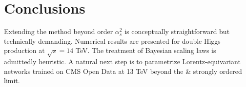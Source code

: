 \section{Conclusions}\label{sec:conclusions}

Extending the method beyond order $\alpha_s^2$ is conceptually
straightforward but technically demanding. Numerical results are
presented for double Higgs production at $\sqrt{s} = 14$ TeV. The
treatment of Bayesian scaling laws is admittedly heuristic. A natural
next step is to parametrize Lorentz-equivariant networks trained on CMS
Open Data at 13 TeV beyond the & strongly ordered limit.


